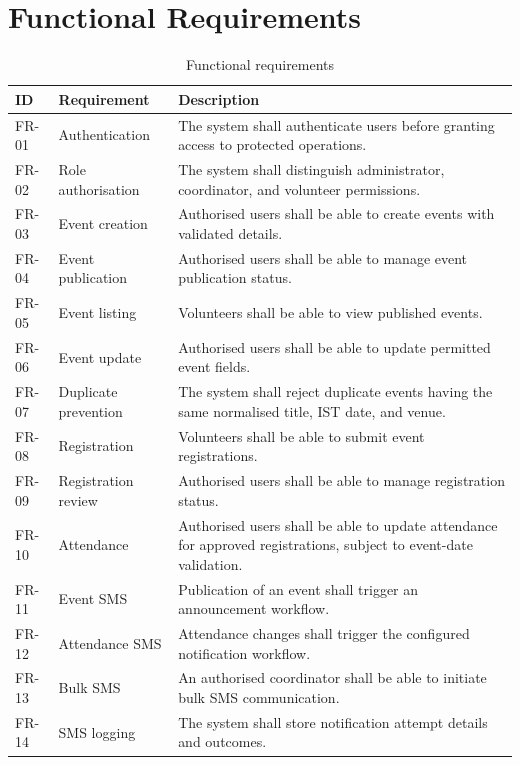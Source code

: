 \documentclass[12pt,a4paper,oneside]{report}
\begin{document}
\section{Functional Requirements}
\begin{longtable}{|p{1.4cm}|p{4.0cm}|p{8.0cm}|}
\caption{Functional requirements}\\ \hline
\textbf{ID} & \textbf{Requirement} & \textbf{Description}\\ \hline
FR-01 & Authentication & The system shall authenticate users before granting access to protected operations.\\ \hline
FR-02 & Role authorisation & The system shall distinguish administrator, coordinator, and volunteer permissions.\\ \hline
FR-03 & Event creation & Authorised users shall be able to create events with validated details.\\ \hline
FR-04 & Event publication & Authorised users shall be able to manage event publication status.\\ \hline
FR-05 & Event listing & Volunteers shall be able to view published events.\\ \hline
FR-06 & Event update & Authorised users shall be able to update permitted event fields.\\ \hline
FR-07 & Duplicate prevention & The system shall reject duplicate events having the same normalised title, IST date, and venue.\\ \hline
FR-08 & Registration & Volunteers shall be able to submit event registrations.\\ \hline
FR-09 & Registration review & Authorised users shall be able to manage registration status.\\ \hline
FR-10 & Attendance & Authorised users shall be able to update attendance for approved registrations, subject to event-date validation.\\ \hline
FR-11 & Event SMS & Publication of an event shall trigger an announcement workflow.\\ \hline
FR-12 & Attendance SMS & Attendance changes shall trigger the configured notification workflow.\\ \hline
FR-13 & Bulk SMS & An authorised coordinator shall be able to initiate bulk SMS communication.\\ \hline
FR-14 & SMS logging & The system shall store notification attempt details and outcomes.\\ \hline
\end{longtable}
\end{document}

